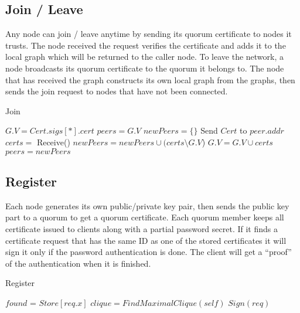 \subsection{Join / Leave}
Any node can join / leave anytime by sending its quorum certificate to
nodes it trusts. The node received the request verifies the
certificate and adds it to the local graph which will be returned to
the caller node. To leave the network, a node broadcasts its quorum
certificate to the quorum it belongs to.
The node that has received the graph constructs its own local graph
from the graphs, then sends the join request to nodes that have not
been connected.

\begin{algorithm}
  \caption{Join}
  \SetAlgoNoLine
  $G.V = Cert.sigs[*].cert$\;
  $peers = G.V$\;
  {
    $newPeers = \{\}$\;
    {
      Send $Cert$ to $peer.addr$\;
      $certs = $ Receive()\;
      $newPeers = newPeers \cup (certs \setminus G.V$)\;
      $G.V = G.V \cup certs$\;
    }
    $peers = newPeers$\;
  }
\end{algorithm}

\subsection{Register}
\label{register}
Each node generates its own public/private key pair, then sends the
public key part to a quorum to get a quorum certificate. Each quorum
member keeps all certificate issued to clients along with a partial
password secret. If it finds a certificate request that has the same
ID as one of the stored certificates it will sign it only if the
password authentication is done. The client will get a ``proof'' of
the authentication when it is finished.

\begin{algorithm}
  \caption{Register}
  \SetAlgoNoLine
  $found$ = $Store[req.x]$\;
  {
    $clique = FindMaximalClique(self)$\;
    {
      $Sign(req)$\;
    }
  }
\end{algorithm}
